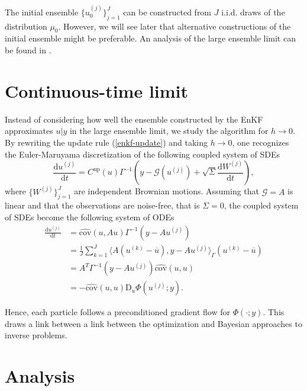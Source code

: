 \documentclass[10pt,a4paper]{article}
\begin{document}
The initial ensemble $\{ u_0^{(j)}\}_{j=1}^J$ can be constructed from $J$ i.i.d. draws of the distribution $\mu_0$. 
However, we will see later that alternative constructions of the initial ensemble might
be preferable. An analysis of the large ensemble limit can be found in \cite{goldstein2007bayes, law2016deterministic,ernst2015analysis}.

\section*{Continuous-time limit}

Instead of considering how well the ensemble constructed by the EnKF approximates 
$u | y$ in the large ensemble limit, we study the algorithm for $h \rightarrow 0$. By rewriting the update rule (\ref{enkf-update})
and taking $h \rightarrow 0$, one recognizes the Euler-Maruyama discretization
of the following coupled system of SDEs
\begin{equation*}
    \frac{\text{d}u^{(j)}}{\text{d}t} = C^{\text{up}}(u)\Gamma^{-1}\left(y - \mathcal{G}(u^{(j)}) + \sqrt{\Sigma}\frac{\text{d}W^{(j)}}{\text{d}t}\right),
\end{equation*}
where $\{W^{(j)}\}_{j=1}^J$ are independent Brownian motions. Assuming that $\mathcal{G} = A$ is
linear and that the observations are noise-free, that is
$\Sigma = 0$, the coupled system of SDEs become the following system of ODEs
\begin{equation*}
\begin{aligned}
    \frac{\text{d}u^{(j)}}{\text{d}t} &= \hat{\text{cov}}(u, Au)\Gamma^{-1}(y - Au^{(j)})\\
&= \frac1J\sum_{k=1}^J \langle A(u^{(k)} - \overline{u}), y - Au^{(j)}\rangle_\Gamma(u^{(k)} - \overline{u})\\
&= A^T\Gamma^{-1}(y - Au^{(j)}) \hat{\text{cov}}(u, u)\\
&= -\hat{\text{cov}}(u, u)\text{D}_u\Phi(u^{(j)}; y).
\end{aligned} \tag{ODE}
\end{equation*}

Hence, each particle follows a preconditioned gradient flow for $\Phi(\cdot; y)$. This draws a link between a link between the optimization
and Bayesian approaches to inverse problems.

\section*{Analysis}
\end{document}
